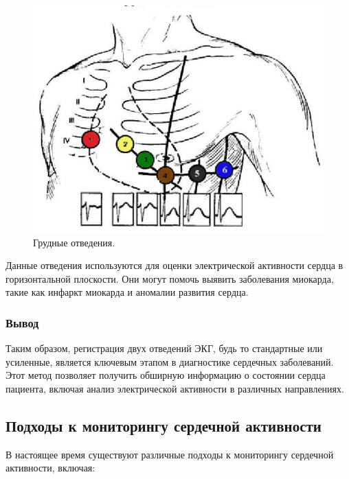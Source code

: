 \documentclass[12pt, russian]{extarticle}
\begin{document}
\begin{spacing}{1.5}
\begin{figure}[htbp]
\centering
\includegraphics[scale=0.46]{resources/грудные отведения .png}
\caption{Грудные отведения.}
\label{fig:my_label}
\end{figure}

Данные отведения используются для оценки электрической активности сердца в горизонтальной плоскости. Они могут помочь выявить заболевания миокарда, такие как инфаркт миокарда и аномалии развития сердца.

\newpage
\subsubsection{Вывод}

Таким образом, регистрация двух отведений ЭКГ, будь то стандартные или усиленные, является ключевым этапом в диагностике сердечных заболеваний. Этот метод позволяет получить обширную информацию о состоянии сердца пациента, включая анализ электрической активности в различных направлениях.

\newpage
\subsection{Подходы к мониторингу сердечной активности}


В настоящее время существуют различные подходы к мониторингу сердечной активности, включая:


\end{spacing}
\end{document}
